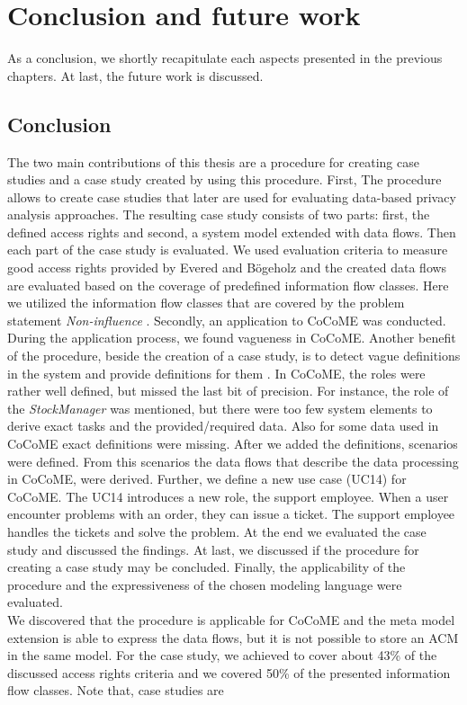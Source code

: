 
\chapter{Conclusion and future work}
\label{ch:Conclusion}
As a conclusion, we shortly recapitulate each aspects presented in the previous chapters. At last, the future work is discussed.
\section{Conclusion}
The two main contributions of this thesis are a procedure for creating case studies and a case study created by using this procedure. First, The procedure allows to create case studies that later are used for evaluating data-based privacy analysis approaches. The resulting case study consists of two parts: first, the defined access rights and second, a system model extended with data flows. Then each part of the case study is evaluated. We used evaluation criteria to measure good access rights provided by Evered and Bögeholz \cite{CaseStudyAndAccessrigths} and the created data flows are evaluated based on the coverage of predefined information flow classes. Here we utilized the information flow classes that are covered by the problem statement \textit{Non-influence} \cite{Noninfluence}. Secondly, an application to CoCoME was conducted. During the application process, we found vagueness in CoCoME. Another benefit of the procedure, beside the creation of a case study, is to detect vague definitions in the system and provide definitions for them . In CoCoME, the roles were rather well defined, but missed the last bit of precision. For instance, the role of the \textit{StockManager} was mentioned, but there were too few system elements to derive exact tasks and the provided/required data. Also for some data used in CoCoME exact definitions were missing. After we added the definitions, scenarios were defined. From this scenarios the data flows that describe the data processing in CoCoME, were derived. Further, we define a new use case (UC14) for CoCoME. The UC14 introduces a new role, the support employee. When a user encounter problems with an order, they can issue a ticket. The support employee handles the tickets and solve the problem. At the end we evaluated the case study and discussed the findings. At last, we discussed if the procedure for creating a case study may be concluded. Finally, the applicability of the procedure and the expressiveness of the chosen modeling language were evaluated.\\ We discovered that the procedure is applicable for CoCoME and the meta model extension is able to express the data flows, but it is not possible to store an ACM in the same model. For the case study, we achieved to cover about 43\% of the discussed access rights criteria and we covered 50\% of the presented information flow classes. Note that, case studies are 